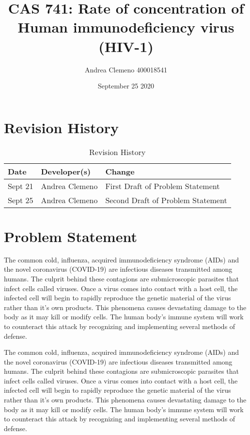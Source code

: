 \documentclass{article}
\title{CAS 741: Rate of concentration of Human immunodeficiency virus (HIV-1)}
\author{Andrea Clemeno      400018541}
\date{September 25 2020}
\begin{document}
\maketitle
\newpage
\section{Revision History}

\begin{table}[hp]
\caption{Revision History} \label{TblRevisionHistory}
\begin{tabularx}{\textwidth}{llX}
\toprule
\textbf{Date} & \textbf{Developer(s)} & \textbf{Change}\\
\midrule
Sept 21 & Andrea Clemeno & First Draft of Problem Statement\\
Sept 25 & Andrea Clemeno & Second Draft of Problem Statement\\
\bottomrule
\end{tabularx}
\end{table}

\iffalse
80 word wrap for TEXmaker
123456789 123456789 123456789 123456789 123456789 123456789 123456789 123456789
\fi


\newpage
\section{Problem Statement}

The common cold, influenza, acquired immunodeficiency syndrome (AIDs) and the 
novel coronavirus (COVID-19) are infectious diseases transmitted among humans. 
The culprit behind these contagions are submicroscopic parasites that infect 
cells called viruses. Once a virus comes into contact with a host cell, the 
infected cell will begin to rapidly reproduce the genetic material of the virus 
rather than it’s own products. This phenomena causes devastating damage to the 
body as it may kill or modify cells. The human body’s immune system will work to 
counteract this attack by recognizing and implementing several methods of 
defense. 

The common cold, influenza, acquired immunodeficiency syndrome (AIDs) and the 
novel coronavirus (COVID-19) are infectious diseases transmitted among humans. 
The culprit behind these contagions are submicroscopic parasites that infect 
cells called viruses. Once a virus comes into contact with a host cell, the 
infected cell will begin to rapidly reproduce the genetic material of the virus 
rather than it’s own products. This phenomena causes devastating damage to the 
body as it may kill or modify cells. The human body’s immune system will work to 
counteract this attack by recognizing and implementing several methods of 
defense. 
\end{document}
